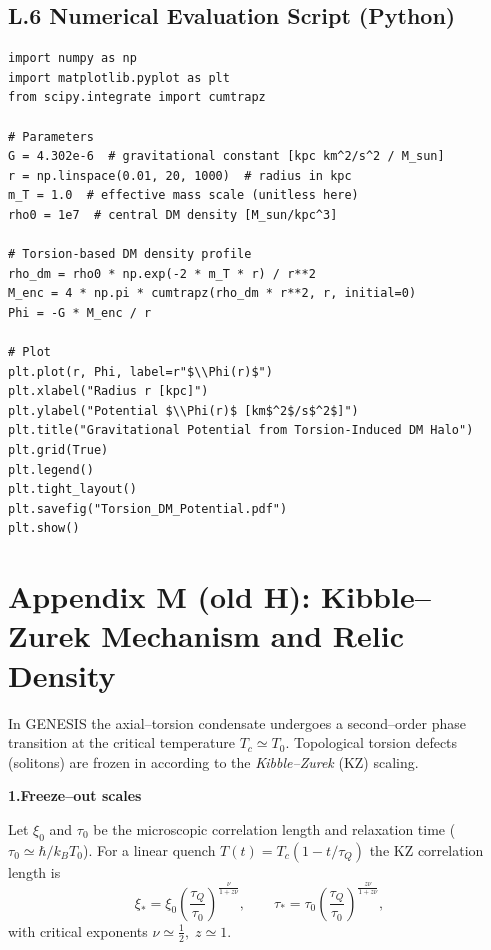 \documentclass{article}
\begin{document}
\subsection*{L.6 Numerical Evaluation Script (Python)}
\begin{verbatim}
import numpy as np
import matplotlib.pyplot as plt
from scipy.integrate import cumtrapz

# Parameters
G = 4.302e-6  # gravitational constant [kpc km^2/s^2 / M_sun]
r = np.linspace(0.01, 20, 1000)  # radius in kpc
m_T = 1.0  # effective mass scale (unitless here)
rho0 = 1e7  # central DM density [M_sun/kpc^3]

# Torsion-based DM density profile
rho_dm = rho0 * np.exp(-2 * m_T * r) / r**2
M_enc = 4 * np.pi * cumtrapz(rho_dm * r**2, r, initial=0)
Phi = -G * M_enc / r

# Plot
plt.plot(r, Phi, label=r"$\\Phi(r)$")
plt.xlabel("Radius r [kpc]")
plt.ylabel("Potential $\\Phi(r)$ [km$^2$/s$^2$]")
plt.title("Gravitational Potential from Torsion-Induced DM Halo")
plt.grid(True)
plt.legend()
plt.tight_layout()
plt.savefig("Torsion_DM_Potential.pdf")
plt.show()
\end{verbatim}





\section*{Appendix M (old H): Kibble--Zurek Mechanism and Relic Density}
\label{app:kibble-zurek}



In GENESIS the axial--torsion condensate undergoes a second--order phase
transition at the critical temperature \(T_c\simeq T_0\).
Topological torsion defects (solitons) are frozen in according to the
\emph{Kibble--Zurek} (KZ) scaling.

\vspace{0.6em}
\noindent\textbf{1.\;Freeze--out scales}

Let  
\(\xi_0\) and \(\tau_0\) be the microscopic correlation length
and relaxation time (\(\tau_0\simeq\hbar/k_{\!B}T_0\)).
For a linear quench \(T(t)=T_c(1-t/\tau_Q)\) the KZ correlation length is \cite{kibble1976,Żurek1985}
\[
\xi_*=\xi_0\!\left(\frac{\tau_Q}{\tau_0}\right)^{\!\frac{\nu}{1+z\nu}},
\qquad
\tau_*=\tau_0\!\left(\frac{\tau_Q}{\tau_0}\right)^{\!\frac{z\nu}{1+z\nu}},
\]
with critical exponents \(\nu\simeq\frac12,\;z\simeq1\).
\end{document}
